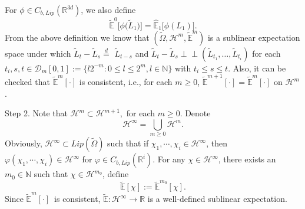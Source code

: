 \documentclass[a4paper,oneside,10pt]{article}%
\numberwithin{equation}{section}
\begin{document}
For $\phi \in C_{b,Lip}(\mathbb{R}^{3d})$, we also define
\[
\mathbb{\tilde{E}}^{0}\big[\phi \big(\tilde{L}_{1}\big)\big]=\mathbb{\hat{E}%
}_{1}\big[\phi(L_{1})\big].
\]
From the above definition we know that $(\tilde{\Omega},\mathcal{H}%
^{m},\mathbb{\tilde{E}}^{m})$ is a sublinear expectation space under which
$\tilde{L}_{t}-\tilde{L}_{s}\overset{d}{=}$ $\tilde{L}_{t-s}$ and $\tilde
{L}_{t}-\tilde{L}_{s}\perp \! \! \! \perp(\tilde{L}_{t_{1}},\ldots,\tilde
{L}_{t_{i}})$ for each $t_{i},s,t\in \mathcal{D}_{m}[0,1]:=\{l2^{-m}:0\leq
l\leq2^{m},l\in \mathbb{N}\}$ with $t_{i}\leq s\leq t$. Also, it can be checked
that $\mathbb{\tilde{E}}^{m}[\cdot]$ is consistent, i.e., for each $m\geq0$,
$\mathbb{\tilde{E}}^{m+1}[\cdot]=\mathbb{\tilde{E}}^{m}[\cdot]$ on
$\mathcal{H}^{m}$.

Step 2. Note that $\mathcal{H}^{m}\subset \mathcal{H}^{m+1}$,\ for each
$m\geq0$. Denote
\[
\mathcal{H}^{\infty}=\bigcup_{m\geq0}\mathcal{H}^{m}.
\]
Obviously, $\mathcal{H}^{\infty}\subset Lip(\tilde{\Omega})$ such that if
$\chi_{1},\cdots,\chi_{i}\in \mathcal{H}^{\infty}$, then $\varphi(\chi
_{1},\cdots,\chi_{i})\in \mathcal{H}^{\infty}$ for $\varphi \in C_{b,Lip}%
(\mathbb{R}^{i})$. For any $\chi \in \mathcal{H}^{\infty}$, there exists an
$m_{0}\in \mathbb{N}$ such that $\chi \in \mathcal{H}^{m_{0}}$, define
\[
\mathbb{\tilde{E}}[\chi]:=\mathbb{\tilde{E}}^{m_{0}}[\chi].
\]
Since $\mathbb{\tilde{E}}^{m}[\cdot]$\ is consistent, $\mathbb{\tilde{E}%
}:\mathcal{H}^{\infty}\rightarrow \mathbb{R}$ is a well-defined sublinear
expectation.
\end{document}
